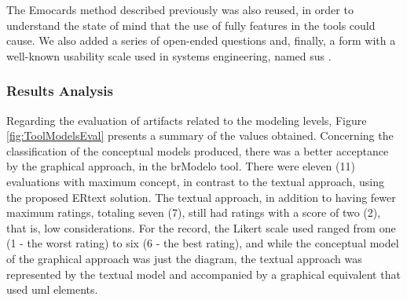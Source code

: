 The Emocards method described previously was also reused, in order to understand the state of mind that the use of fully features in the tools could cause.
We also added a series of open-ended questions and, finally, a form with a well-known usability scale used in systems engineering, named \ac{sus} \cite{sus:1995}.
 
\subsubsection{Results Analysis}

Regarding the evaluation of artifacts related to the modeling levels, Figure \ref{fig:ToolModelsEval} presents a summary of the values obtained.
Concerning the classification of the conceptual models produced, there was a better acceptance by the graphical approach, in the brModelo tool.
There were eleven (11) evaluations with maximum concept, in contrast to the textual approach, using the proposed ERtext solution.
The textual approach, in addition to having fewer maximum ratings, totaling seven (7), still had ratings with a score of two (2), that is, low considerations.
For the record, the Likert scale used ranged from one (1 - the worst rating) to six (6 - the best rating), and while the conceptual model of the graphical approach was just the diagram, the textual approach was represented by the textual model and accompanied by a graphical equivalent that used \ac{uml} elements.

